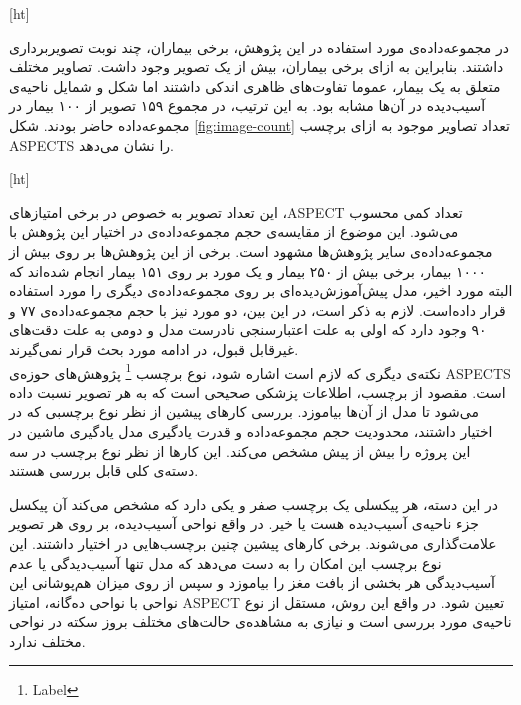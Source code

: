 [ht]

در مجموعه‌داده‌ی مورد استفاده در این پژوهش، برخی بیماران، چند نوبت تصویربرداری داشتند.
بنابراین به ازای برخی بیماران، بیش از یک تصویر وجود داشت.
تصاویر مختلف متعلق به یک بیمار، عموما تفاوت‌های ظاهری اندکی داشتند اما شکل و شمایل ناحیه‌ی آسیب‌دیده در آن‌ها مشابه بود.
به این ترتیب، در مجموع ۱۵۹ تصویر از ۱۰۰ بیمار در مجموعه‌داده حاضر بودند.
شکل \ref{fig:image-count} 
تعداد تصاویر موجود 
به ازای برچسب ASPECTS را نشان می‌دهد.


[ht]

این تعداد تصویر به خصوص در برخی امتیاز‌های ،ASPECT تعداد کمی محسوب می‌شود.
این موضوع از مقایسه‌ی حجم مجموعه‌داده‌ی در اختیار این پژوهش با مجموعه‌داده‌ی 
سایر پژوهش‌ها مشهود است.
برخی از این پژوهش‌ها 
\cite{cao2022deep,upadhyay2023deep,chen2022improving}
بر روی 
بیش از ۱۰۰۰ بیمار، برخی 
\cite{lee2023clinical,chiang2022deep,jung2018evaluating,kuang2019automated,kuang2021eis}
بیش از ۲۵۰ بیمار
و یک مورد 
\cite{naganuma2021alberta}
 بر روی ۱۵۱ بیمار 
انجام شده‌اند که البته مورد اخیر، مدل پیش‌آموزش‌دیده‌ای بر روی مجموعه‌داده‌ی دیگری را مورد استفاده قرار داده‌است.
لازم به ذکر است، در این بین، دو مورد
\cite{golkonda2022automated,yu2021automated}
نیز با حجم مجموعه‌داده‌ی ۷۷ و ۹۰ وجود دارد
که اولی به علت اعتبارسنجی نادرست مدل و دومی به علت دقت‌های غیرقابل قبول، در ادامه مورد بحث قرار نمی‌گیرند.\\


نکته‌ی دیگری که لازم است اشاره شود، نوع برچسب
\footnote{Label}
پژوهش‌های 
حوزه‌ی ASPECTS است.
مقصود از برچسب، اطلاعات پزشکی صحیحی است که به هر تصویر نسبت داده می‌شود تا مدل از آن‌ها بیاموزد.
بررسی کار‌های پیشین از نظر نوع برچسبی که در اختیار داشتند، محدودیت حجم مجموعه‌داده و قدرت یادگیری مدل یادگیری ماشین در این پروژه را بیش از پیش مشخص می‌کند.
این کار‌ها از نظر نوع برچسب در سه دسته‌ی کلی قابل بررسی هستند. 

در این دسته،
هر پیکسلی یک برچسب صفر و یکی دارد که مشخص می‌کند آن پیکسل جزء ناحیه‌ی آسیب‌دیده هست یا خیر.
در واقع نواحی آسیب‌دیده، بر روی هر تصویر علامت‌گذاری می‌شوند.
برخی کار‌های پیشین
چنین برچسب‌هایی در اختیار داشتند.
\cite{cao2022deep,upadhyay2023deep,kuang2021eis,chen2022improving}
این نوع برچسب این امکان را به دست می‌دهد که مدل تنها آسیب‌دیدگی یا عدم آسیب‌دیدگی هر بخشی از بافت مغز را بیاموزد و سپس از روی میزان هم‌پوشانی این نواحی با نواحی ده‌گانه، امتیاز ASPECT تعیین شود.
در واقع این روش، مستقل از نوع ناحیه‌ی مورد بررسی است و نیازی به مشاهده‌ی حالت‌های مختلف بروز سکته در نواحی مختلف ندارد.

